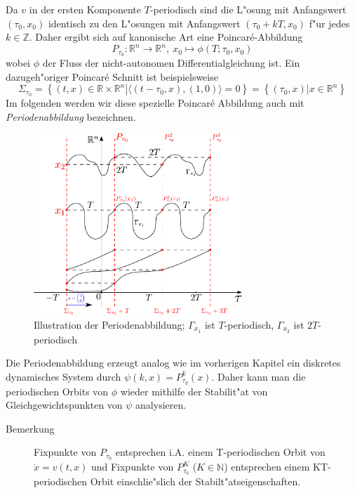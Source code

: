 \documentclass[a4paper, 13pt]{scrreprt}
\theoremstyle{definition} \newtheorem{definition}{Definition}[section]
\newcommand{\RR}{\mathbb{R}}
\begin{document}
Da $v$ in der ersten Komponente $T$-periodisch sind die L"osung mit Anfangswert $(\tau_0, x_0)$ identisch zu den L"osungen mit Anfangswert $(\tau_0 + kT, x_0)$ f"ur jedes $k\in\mathbb{Z}$. Daher ergibt sich auf kanonische Art eine Poincar\'{e}-Abbildung
\[P_{\tau_0} : \mathbb{R}^n \to \mathbb{R}^n, \ x_0\mapsto \phi(T;\tau_0,x_0) \]
wobei $\phi$ der Fluss der nicht-autonomen Differentialgleichung ist. Ein dazugeh"origer Poincar\'{e} Schnitt ist beispielsweise
$$ \Sigma_{\tau_0} = \left \{ \left. (t,x)\in\RR\times\RR^n \right | \langle (t - \tau_0 ,x), (1,0)\rangle = 0 \right \} = \left \{ \left . (\tau_0, x) \right| x \in \RR^n \right \} $$
Im folgenden werden wir diese spezielle Poincar\'{e} Abbildung auch mit \emph{Periodenabbildung} bezeichnen.
\begin{figure}[htpb]
		\centering
		\includegraphics[width=0.7\textwidth]{img/poincare_Bendixson/periodenabbildung.pdf}
		\caption{Illustration der Periodenabbildung; $\Gamma_{x_1}$ ist $T$-periodisch, $\Gamma_{x_2}$ ist $2T$-periodisch}
\end{figure}


Die Periodenabbildung erzeugt analog wie im vorherigen Kapitel ein diskretes dynamisches System durch $\psi(k, x) = P_{\tau_0}^k(x)$. Daher kann man die periodischen Orbits von $\phi$ wieder mithilfe der Stabilit"at von Gleichgewichtspunkten von $\psi$ analysieren.

\begin{description}
	\item[Bemerkung] Fixpunkte von \(P_{\tau_0}\) entsprechen i.A. einem T-periodischen Orbit von \(\dot{x} = v(t,x) \) und Fixpunkte von \(P_{\tau_0}^K\) (\(K\in\mathbb{N}\)) entsprechen einem KT-periodischen Orbit einschlie"slich der Stabilt"atseigenschaften.
\end{description}
\end{document}
